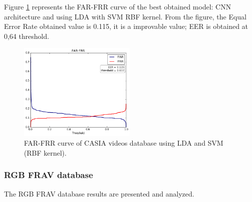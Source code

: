 Figure \ref{fig:CASIA_vid_FAR_FRR} represents the FAR-FRR curve of the best obtained model: CNN architecture and using LDA with SVM RBF kernel. From the figure, the Equal Error Rate obtained value is 0.115, it is a improvable value; EER is obtained at 0,64 threshold.


\begin{figure}[htb]
\centering
\includegraphics[width=0.5\textwidth]{images/FAR-FRR/Casia_vid_LDA_SVM_RBF_FAR_FRR.png}
\caption{FAR-FRR curve of CASIA videos database using LDA and SVM (RBF kernel).} \label{fig:CASIA_vid_FAR_FRR}
\end{figure}

\subsubsection{RGB FRAV database}
The RGB FRAV database results are presented and analyzed.\\


